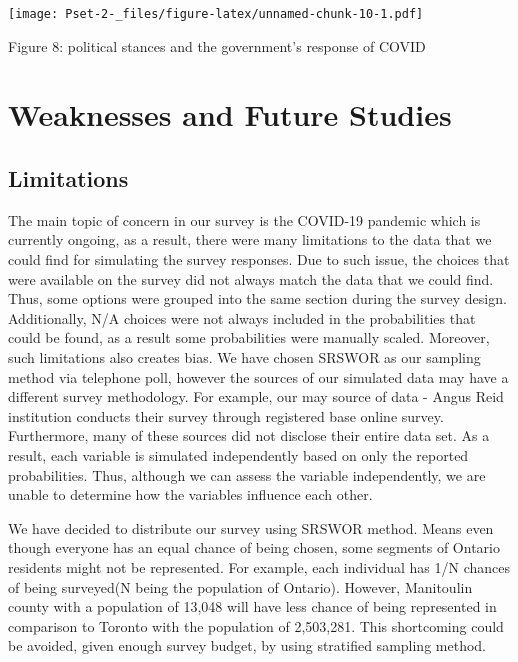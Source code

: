 \documentclass[
]{article}
\begin{document}
\texttt{[image: Pset-2-\_files/figure-latex/unnamed-chunk-10-1.pdf]}

Figure 8: political stances and the government's response of COVID

\newpage

\hypertarget{weaknesses-and-future-studies}{%
\section{Weaknesses and Future
Studies}\label{weaknesses-and-future-studies}}

\hypertarget{limitations}{%
\subsection{Limitations}\label{limitations}}

The main topic of concern in our survey is the COVID-19 pandemic which
is currently ongoing, as a result, there were many limitations to the
data that we could find for simulating the survey responses. Due to such
issue, the choices that were available on the survey did not always
match the data that we could find. Thus, some options were grouped into
the same section during the survey design. Additionally, N/A choices
were not always included in the probabilities that could be found, as a
result some probabilities were manually scaled. Moreover, such
limitations also creates bias. We have chosen SRSWOR as our sampling
method via telephone poll, however the sources of our simulated data may
have a different survey methodology. For example, our may source of data
- Angus Reid institution conducts their survey through registered base
online survey. Furthermore, many of these sources did not disclose their
entire data set. As a result, each variable is simulated independently
based on only the reported probabilities. Thus, although we can assess
the variable independently, we are unable to determine how the variables
influence each other.

We have decided to distribute our survey using SRSWOR method. Means even
though everyone has an equal chance of being chosen, some segments of
Ontario residents might not be represented. For example, each individual
has 1/N chances of being surveyed(N being the population of Ontario).
However, Manitoulin county with a population of 13,048 will have less
chance of being represented in comparison to Toronto with the population
of 2,503,281. This shortcoming could be avoided, given enough survey
budget, by using stratified sampling method.
\end{document}
